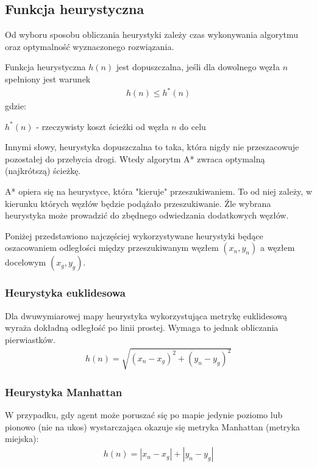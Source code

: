 \subsection{Funkcja heurystyczna}
\label{ch:astar_heurystyki}
Od wyboru sposobu obliczania heurystyki zależy czas wykonywania algorytmu oraz optymalność wyznaczonego rozwiązania.

Funkcja heurystyczna $h(n)$ jest dopuszczalna, jeśli dla dowolnego węzła $n$ spełniony jest warunek
\begin{gather}
 	h(n) \leq h^*(n)
 	\label{eq_astar_heurystyka_admissible} 
\end{gather}
 gdzie:

 $h^*(n)$ - rzeczywisty koszt ścieżki od węzła $n$ do celu

Innymi słowy, heurystyka dopuszczalna to taka, która nigdy nie przeszacowuje pozostałej do przebycia drogi. Wtedy algorytm A* zwraca optymalną (najkrótszą) ścieżkę. \cite{cooppath}

A* opiera się na heurystyce, która "kieruje" przeszukiwaniem.
To od niej zależy, w kierunku których węzłów będzie podążało przeszukiwanie.
Źle wybrana heurystyka może prowadzić do zbędnego odwiedzania dodatkowych węzłów.

Poniżej przedstawiono najczęściej wykorzystywane heurystyki będące oszacowaniem odległości między przeszukiwanym węzłem $(x_n, y_n)$ a węzłem docelowym $(x_g, y_g)$.

\subsubsection{Heurystyka euklidesowa}
Dla dwuwymiarowej mapy heurystyka wykorzystująca metrykę euklidesową wyraża dokładną odległość po linii prostej. Wymaga to jednak obliczania pierwiastków.
\begin{gather}
 	h(n) = \sqrt{(x_n - x_g)^2 + (y_n - y_g)^2}
 	\label{eq_astar_heu_euc} 
\end{gather}

\subsubsection{Heurystyka Manhattan}
W przypadku, gdy agent może poruszać się po mapie jedynie poziomo lub pionowo (nie na ukos) wystarczająca okazuje się metryka Manhattan (metryka miejska):
\begin{gather}
 	h(n) = |x_n - x_g| + |y_n - y_g|
 	\label{eq_astar_heu_man} 
\end{gather}

